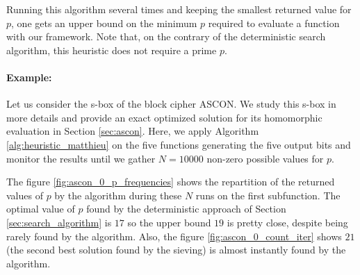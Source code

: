 

Running this algorithm several times and keeping the smallest returned value for $p$, one gets an upper bound on the minimum $p$ required to evaluate a function with our framework. Note that, on the contrary of the deterministic search algorithm, this heuristic does not require a prime $p$.


\paragraph{Example:} Let us consider the s-box of the block cipher ASCON. We study this s-box in more details and provide an exact optimized solution for its homomorphic evaluation in Section \ref{sec:ascon}. Here, we apply Algorithm \ref{alg:heuristic_matthieu} on the five functions generating the five output bits and monitor the results until we gather $N=10000$ non-zero possible values for $p$.


The figure \ref{fig:ascon_0_p_frequencies} shows the repartition of the returned values of $p$ by the algorithm during these $N$ runs on the first subfunction. The optimal value of $p$ found by the deterministic approach of Section \ref{sec:search_algorithm} is $17$ so the upper bound $19$ is pretty close, despite being rarely found by the algorithm. Also, the figure \ref{fig:ascon_0_count_iter} shows $21$ (the second best solution found by the sieving) is almost instantly found by the algorithm.


